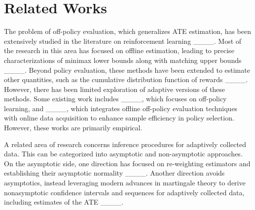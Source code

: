 \section{Related Works}
The problem of off-policy evaluation, which generalizes ATE estimation, has been extensively studied in the literature on reinforcement learning ____. 
Most of the research in this area has focused on offline estimation, leading to precise characterizations of minimax lower bounds along with matching upper bounds ____. Beyond policy evaluation, these methods have been extended to estimate other quantities, such as the cumulative distribution function of rewards ____. 
However, there has been limited exploration of adaptive versions of these methods. 
Some existing work includes ____, which focuses on off-policy learning, and ____, which integrates offline off-policy evaluation techniques with online data acquisition to enhance sample efficiency in policy selection. 
However, these works are primarily empirical.

A related area of research concerns inference procedures for adaptively collected data. This  can be categorized into asymptotic and non-asymptotic approaches. 
On the asymptotic side, one direction has focused on re-weighting estimators and establishing their asymptotic normality ____. 
Another direction avoids asymptotics, instead leveraging modern advances in martingale theory to derive nonasymptotic confidence intervals and sequences for adaptively collected data, including estimates of the ATE ____.